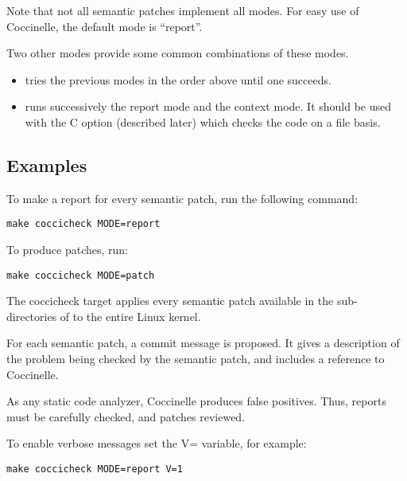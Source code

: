 \documentclass[a4paper,8pt,english]{sphinxmanual}
\begin{document}
Note that not all semantic patches implement all modes. For easy use
of Coccinelle, the default mode is ``report''.

Two other modes provide some common combinations of these modes.
\begin{itemize}
\item {} 
 tries the previous modes in the order above until one succeeds.

\item {} 
 runs successively the report mode and the context mode.
It should be used with the C option (described later)
which checks the code on a file basis.

\end{itemize}


\subsection{Examples}
\label{dev-tools/coccinelle:examples}
To make a report for every semantic patch, run the following command:

\begin{Verbatim}[commandchars=\\\{\}]
make coccicheck MODE=report
\end{Verbatim}

To produce patches, run:

\begin{Verbatim}[commandchars=\\\{\}]
make coccicheck MODE=patch
\end{Verbatim}

The coccicheck target applies every semantic patch available in the
sub-directories of  to the entire Linux kernel.

For each semantic patch, a commit message is proposed.  It gives a
description of the problem being checked by the semantic patch, and
includes a reference to Coccinelle.

As any static code analyzer, Coccinelle produces false
positives. Thus, reports must be carefully checked, and patches
reviewed.

To enable verbose messages set the V= variable, for example:

\begin{Verbatim}[commandchars=\\\{\}]
make coccicheck MODE=report V=1
\end{Verbatim}
\end{document}
